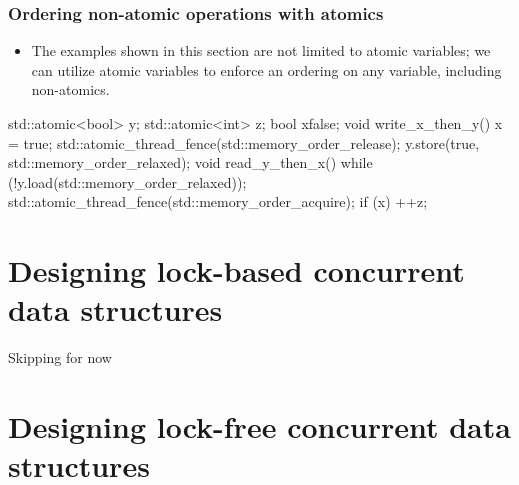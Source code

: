 \documentclass[11pt, a4paper]{article}
\theoremstyle{definition}
\theoremstyle{remark}
\begin{document}
\subsubsection{Ordering non-atomic operations with atomics}
\begin{itemize}
    \item The examples shown in this section are not limited to atomic variables; we can utilize atomic variables to enforce an ordering on any variable, including non-atomics.
\end{itemize}
\begin{cppcode}
std::atomic<bool> y;
std::atomic<int> z;
bool x{false};
void write_x_then_y() {
    x = true;
    std::atomic_thread_fence(std::memory_order_release);
    y.store(true, std::memory_order_relaxed);
}
void read_y_then_x() {
    while (!y.load(std::memory_order_relaxed));
    std::atomic_thread_fence(std::memory_order_acquire);
    if (x) ++z;
}
\end{cppcode}
\newpage
\section{Designing lock-based concurrent data structures}
Skipping for now
\section{Designing lock-free concurrent data structures}
\end{document}
